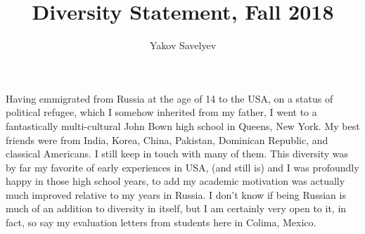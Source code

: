 \documentclass{amsart}
\title {Diversity Statement, Fall 2018}
\author{Yakov Savelyev}
\begin{document}
  
\maketitle
Having emmigrated from Russia at the age of 14 to the USA, on a status of political refugee, which I somehow inherited from my father, I went to a fantastically multi-cultural John Bown high school in Queens, New York. My best friends were from India, Korea, China, Pakistan, Dominican Republic, and classical Americans.
I still keep in touch with many of them. This diversity was by far my favorite of early experiences in USA, (and still is) and I was profoundly happy in those high school years, to add my academic motivation was actually much improved relative to my years in Russia. I don't know if being Russian is much of an addition to diversity in itself, but I am certainly very open to it, in fact, so say my evaluation letters from students here in Colima, Mexico.
\thispagestyle{plain} 
\end{document}
